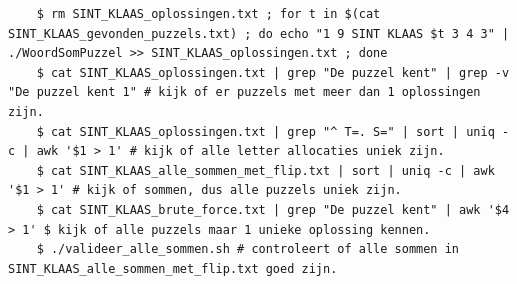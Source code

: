 \documentclass[twocolumn,10pt]{article}
\begin{document}
\begin{lstlisting}
    $ rm SINT_KLAAS_oplossingen.txt ; for t in $(cat SINT_KLAAS_gevonden_puzzels.txt) ; do echo "1 9 SINT KLAAS $t 3 4 3" | ./WoordSomPuzzel >> SINT_KLAAS_oplossingen.txt ; done
    $ cat SINT_KLAAS_oplossingen.txt | grep "De puzzel kent" | grep -v "De puzzel kent 1" # kijk of er puzzels met meer dan 1 oplossingen zijn.
    $ cat SINT_KLAAS_oplossingen.txt | grep "^ T=. S=" | sort | uniq -c | awk '$1 > 1' # kijk of alle letter allocaties uniek zijn.
    $ cat SINT_KLAAS_alle_sommen_met_flip.txt | sort | uniq -c | awk '$1 > 1' # kijk of sommen, dus alle puzzels uniek zijn.
    $ cat SINT_KLAAS_brute_force.txt | grep "De puzzel kent" | awk '$4 > 1' $ kijk of alle puzzels maar 1 unieke oplossing kennen.
    $ ./valideer_alle_sommen.sh # controleert of alle sommen in SINT_KLAAS_alle_sommen_met_flip.txt goed zijn.
\end{lstlisting}
\end{document}
